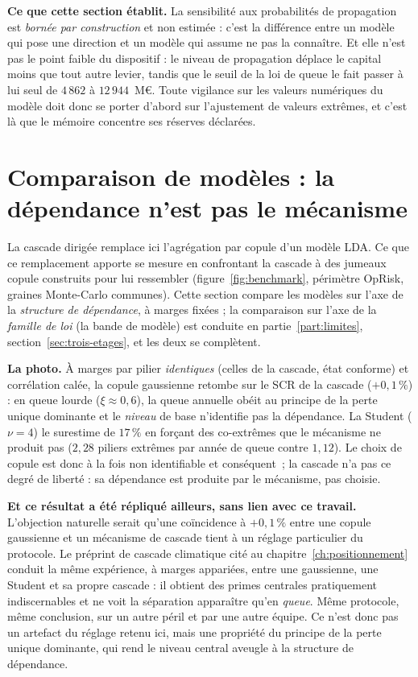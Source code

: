 \begin{cle}
\textbf{Ce que cette section établit.} La sensibilité aux probabilités de propagation est
\emph{bornée par construction} et non estimée : c'est la différence entre un modèle qui pose une
direction et un modèle qui assume ne pas la connaître. Et elle n'est pas le point faible du
dispositif : le niveau de propagation déplace le capital moins que tout autre levier, tandis que
le seuil de la loi de queue le fait passer à lui seul de $4\,862$ à $12\,944$~M\euro. Toute vigilance sur les
valeurs numériques du modèle doit donc se porter d'abord sur l'ajustement de valeurs extrêmes,
et c'est là que le mémoire concentre ses réserves déclarées.
\end{cle}

\section{Comparaison de modèles : la dépendance n'est pas le mécanisme}
\label{sec:benchmark}

La cascade dirigée remplace ici l'agrégation par copule d'un modèle LDA. Ce que ce
remplacement apporte se mesure en confrontant la cascade à des jumeaux copule construits pour lui
ressembler (figure~\ref{fig:benchmark}, périmètre OpRisk, graines
Monte-Carlo communes). Cette section compare les modèles sur l'axe de la \emph{structure de
dépendance}, à marges fixées ; la comparaison sur l'axe de la \emph{famille de loi} (la bande
de modèle) est conduite en partie~\ref{part:limites}, section~\ref{sec:trois-etages}, et les
deux se complètent.

\textbf{La photo.} À marges par pilier \emph{identiques} (celles de la cascade, état
conforme) et corrélation calée, la copule gaussienne retombe sur le SCR de la cascade
($+0{,}1\,\%$) : en queue lourde ($\xi \approx 0{,}6$), la queue annuelle obéit au principe
de la perte unique dominante et le \emph{niveau} de base n'identifie pas la dépendance. La
Student ($\nu = 4$) le surestime de $17\,\%$ en forçant des co-extrêmes que le mécanisme ne
produit pas ($2{,}28$ piliers extrêmes par année de queue contre $1{,}12$). Le choix de
copule est donc à la fois non identifiable et conséquent~; la cascade n'a pas ce degré de
liberté : sa dépendance est produite par le mécanisme, pas choisie.

\textbf{Et ce résultat a été répliqué ailleurs, sans lien avec ce travail.} L'objection naturelle
serait qu'une coïncidence à $+0{,}1\,\%$ entre une copule gaussienne et un mécanisme de cascade
tient à un réglage particulier du protocole. Le préprint de cascade climatique cité au
chapitre~\ref{ch:positionnement} \citep{ccrn2026} conduit la même expérience, à marges appariées,
entre une gaussienne, une Student et sa propre cascade : il obtient des primes centrales
pratiquement indiscernables et ne voit la séparation apparaître qu'en \emph{queue}. Même
protocole, même conclusion, sur un autre péril et par une autre équipe. Ce n'est donc pas un
artefact du réglage retenu ici, mais une propriété du principe de la perte unique dominante,
qui rend le niveau central aveugle à la structure de dépendance.

